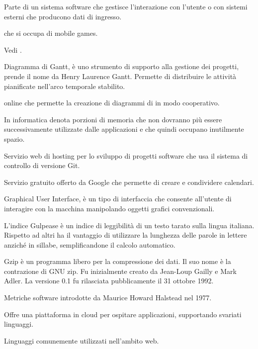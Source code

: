 Parte di un sistema software che gestisce l'interazione con l'utente o con sistemi esterni che producono dati di ingresso.

 che si occupa di mobile games.

Vedi .


Diagramma di Gantt, è uno strumento di supporto alla gestione dei progetti, prende il nome da Henry Laurence Gantt.
Permette di distribuire le attività pianificate nell'arco temporale stabilito.

 online che permette la creazione di diagrammi di  in modo cooperativo.

In informatica denota porzioni di memoria che non dovranno più essere successivamente utilizzate dalle applicazioni e che quindi occupano inutilmente spazio.

Servizio web di hosting per lo sviluppo di progetti software che usa il sistema di controllo di versione Git.

Servizio gratuito offerto da Google che permette di creare e condividere calendari.

Graphical User Interface, è un tipo di interfaccia che consente all'utente di interagire con la macchina manipolando oggetti grafici convenzionali.

L'indice Gulpease è un indice di leggibilità di un testo tarato sulla lingua italiana. Rispetto ad altri ha il vantaggio di utilizzare la lunghezza delle parole in lettere anziché in sillabe, semplificandone il calcolo automatico.

Gzip è un programma libero per la compressione dei dati. Il suo nome è la contrazione di GNU zip. Fu inizialmente creato da Jean-Loup Gailly e Mark Adler. La versione 0.1 fu rilasciata pubblicamente il 31 ottobre 1992.


Metriche software introdotte da Maurice Howard Halstead nel 1977.

Offre una piattaforma in cloud per ospitare applicazioni, supportando svariati linguaggi.

Linguaggi comunemente utilizzati nell'ambito web.

